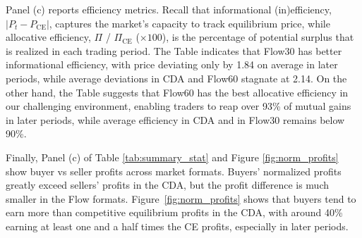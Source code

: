 \documentclass[12pt]{article}
\begin{document}
Panel (c) reports efficiency metrics. Recall that informational (in)efficiency, $\lvert P_t - P_{\text{CE}} \rvert $, captures the market's capacity to track equilibrium price, while allocative efficiency,  $\Pi$ / $\Pi_{\text{CE}}$ ($\times 100$), is the percentage of potential surplus that is realized in each trading period. The Table indicates that Flow30 has better informational efficiency, with price deviating only by 1.84 on average in later periods,
while average deviations in CDA and Flow60 stagnate at 2.14.
On the other hand, the Table suggests that Flow60 has the best allocative efficiency in our challenging environment, enabling traders to reap over 93\% of mutual gains in later periods, while average efficiency 
in CDA and in Flow30 remains below 90\%. 

Finally, Panel (c) of Table \ref{tab:summary_stat} and Figure \ref{fig:norm_profits} show buyer vs seller  profits across market formats. Buyers' normalized profits greatly exceed sellers' profits in the CDA, but the profit difference is much smaller in the Flow formats. 
Figure~\ref{fig:norm_profits} shows that buyers tend to earn more than competitive equilibrium profits in the CDA, with around 40\% earning at least one and a half times the CE profits, especially in later periods. 






\end{document}

